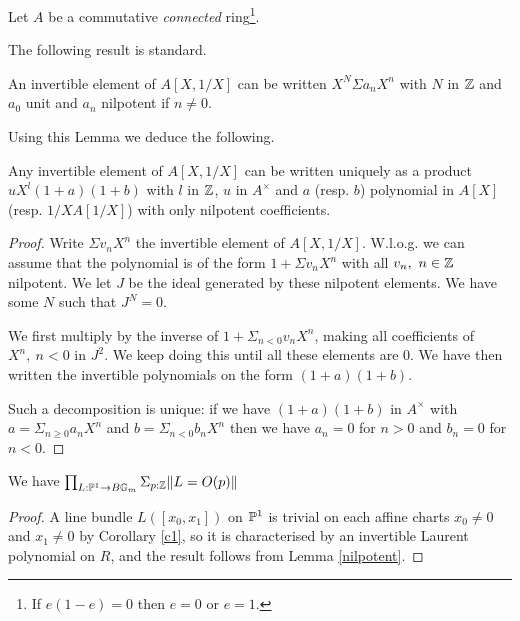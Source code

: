  Let $A$ be a commutative {\em connected} ring\footnote{If $e(1-e) = 0$ then $e=0$ or $e=1$.}.

The following result is standard.

 \begin{lemma}\label{stand}
   An invertible element of $A[X,1/X]$ can be written $X^N\Sigma a_nX^n$ with $N$ in $\mathbb{Z}$
   and $a_0$ unit and $a_n$ nilpotent if $n\neq 0$.
 \end{lemma}
 
 Using this Lemma we deduce the following.

\begin{lemma}\label{nilpotent}
  Any invertible element of $A[X,1/X]$ can be written uniquely as a product
  $uX^l(1+a)(1+b)$ with $l$ in $\mathbb{Z}$, $u$ in $A^{\times}$ and $a$ (resp. $b$)
  polynomial in $A[X]$ (resp. $1/XA[1/X]$) with only nilpotent coefficients.
\end{lemma}

\begin{proof}
  Write $\Sigma v_nX^n$ the invertible element of $A[X,1/X]$.
  W.l.o.g. we can assume that the polynomial is of the form $1 + \Sigma v_nX^n$ with
  all $v_n,~n\in \mathbb{Z}$ nilpotent.
  We let $J$ be the ideal generated by these nilpotent elements.
  We have some $N$ such that $J^N = 0$.
  
  We first multiply by the inverse of $1 + \Sigma_{n<0}v_nX^n$, making all coefficients of
  $X^n,~n<0$ in $J^2$.
  We keep doing this until all these elements are $0$.
  We have then written the invertible polynomials on the form $(1+a)(1+b)$.

  Such a decomposition is unique: if we have $(1+a)(1+b)$ in $A^{\times}$ with $a = \Sigma_{n\geqslant 0}a_nX^n$
  and $b = \Sigma_{n<0}b_nX^n$ then we have $a_n = 0$ for $n>0$ and $b_n = 0$ for $n<0$.
\end{proof}

\begin{corollary}\label{Pic1}
  We have $\prod_{L:\mathbb{P}^1\rightarrow B\mathbb{G}_m}\Sigma_{p:\mathbb{Z}}\|L = O(p)\|$
\end{corollary}

\begin{proof}
A line bundle $L([x_0,x_1])$ on $\mathbb{P}^1$ is trivial on each affine charts $x_0\neq 0$ and $x_1\neq 0$ by Corollary \ref{c1}, so
it is characterised by an invertible Laurent polynomial on $R$, and the result follows from Lemma \ref{nilpotent}.
\end{proof}

